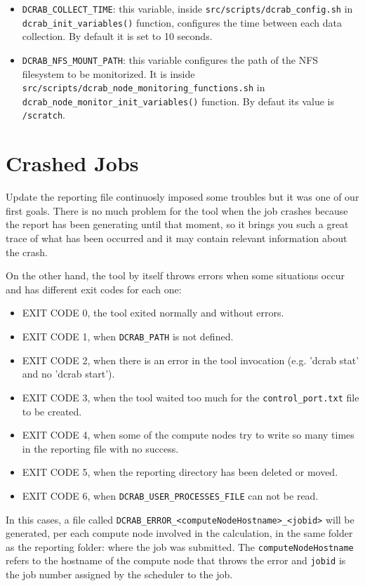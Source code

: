 \documentclass[10pt,a4paper]{report}
\begin{document}
\begin{itemize}
	\item \texttt{DCRAB\_COLLECT\_TIME}: this variable, inside \verb+src/scripts/dcrab_config.sh+ in \texttt{dcrab\_init\_variables()} function, configures the time between each data collection. By default it is set to 10 seconds.
	\item \texttt{DCRAB\_NFS\_MOUNT\_PATH}: this variable configures the path of the NFS filesystem to be monitorized. It is inside \verb+src/scripts/dcrab_node_monitoring_functions.sh+ in \texttt{dcrab\_node\_monitor\_init\_variables()} function. By defaut its value is \verb+/scratch+.
\end{itemize}

\section{Crashed Jobs}
\label{crash}
Update the reporting file continuosly imposed some troubles but it was one of our first goals. There is no much problem for the tool when the job crashes because the report has been generating until that moment, so it brings you such a great trace of what has been occurred and it may contain relevant information about the crash.

On the other hand, the tool by itself throws errors when some situations occur and has different exit codes for each one:

\begin{itemize}
	\item EXIT CODE 0, the tool exited normally and without errors.
	\item EXIT CODE 1, when \texttt{DCRAB\_PATH} is not defined.
	\item EXIT CODE 2, when there is an error in the tool invocation (e.g. 'dcrab stat' and no 'dcrab start').
	\item EXIT CODE 3, when the tool waited too much for the \texttt{control\_port.txt} file to be created.
	\item EXIT CODE 4, when some of the compute nodes try to write so many times in the reporting file with no success.
	\item EXIT CODE 5, when the reporting directory has been deleted or moved.
	\item EXIT CODE 6, when \texttt{DCRAB\_USER\_PROCESSES\_FILE} can not be read.
\end{itemize}

In this cases, a file called \verb+DCRAB_ERROR_<computeNodeHostname>_<jobid>+ will be generated, per each compute node involved in the calculation, in the same folder as the reporting folder: where the job was submitted. The \verb+computeNodeHostname+ refers to the hostname of the compute node that throws the error and \verb+jobid+ is the job number assigned by the scheduler to the job.
\end{document}
